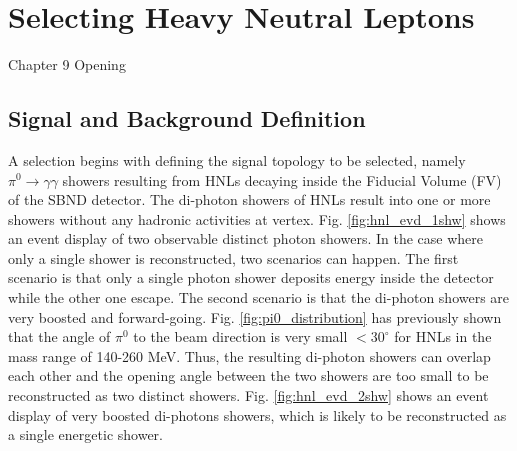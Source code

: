 \chapter{Selecting Heavy Neutral Leptons}
\label{ChapterSelect}

\ifpdf
    \graphicspath{{Chapter9/Figs/Raster/}{Chapter9/Figs/PDF/}{Chapter9/Figs/}}
\else
    \graphicspath{{Chapter9/Figs/Vector/}{Chapter9/Figs/}}
\fi


Chapter 9 Opening

\clearpage

\section{Signal and Background Definition}

A selection begins with defining the signal topology to be selected, namely $\pi^0 \rightarrow \gamma\gamma$ showers resulting from HNLs decaying inside the Fiducial Volume (FV) of the SBND detector.
The di-photon showers of HNLs result into one or more showers without any hadronic activities at vertex.
Fig. \ref{fig:hnl_evd_1shw} shows an event display of two observable distinct photon showers.  
In the case where only a single shower is reconstructed, two scenarios can happen.
The first scenario is that only a single photon shower deposits energy inside the detector while the other one escape.
The second scenario is that the di-photon showers are very boosted and forward-going.
Fig. \ref{fig:pi0_distribution} has previously shown that the angle of $\pi^0$ to the beam direction is very small $< 30^\circ$ for HNLs in the mass range of 140-260 MeV.
Thus, the resulting di-photon showers can overlap each other and the opening angle between the two showers are too small to be reconstructed as two distinct showers. 
Fig. \ref{fig:hnl_evd_2shw} shows an event display of very boosted di-photons showers, which is likely to be reconstructed as a single energetic shower.

